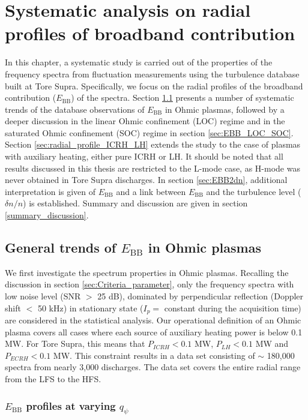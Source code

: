 \chapter{Systematic analysis on radial profiles of broadband contribution} \label{ch:EBB}
\graphicspath{{chapter5_ys/}}
\minitoc

In this chapter, a systematic study is carried out of the properties of the frequency spectra from fluctuation measurements using the turbulence database built at Tore Supra. Specifically, we focus on the radial profiles of the broadband contribution ($E_\mathrm{BB}$) of the spectra. Section \ref{sec:radial_profile_OH} presents a number of systematic trends of the database observations of $E_\mathrm{BB}$ in Ohmic plasmas, followed by a deeper discussion in the linear Ohmic confinement (LOC) regime and in the saturated Ohmic confinement (SOC) regime in section \ref{sec:EBB_LOC_SOC}. Section \ref{sec:radial_profile_ICRH_LH} extends the study to the case of plasmas with auxiliary heating, either pure ICRH or LH. It should be noted that all results discussed in this thesis are restricted to the L-mode case, as H-mode was never obtained in Tore Supra discharges. In section \ref{sec:EBB2dn}, additional interpretation is given of $E_\mathrm{BB}$ and a link between $E_\mathrm{BB}$ and the turbulence level ($\delta n/n$) is established. Summary and discussion are given in section \ref{summary_discussion}.


\section{General trends of $E_\mathrm{BB}$ in Ohmic plasmas} \label{sec:radial_profile_OH}

We first investigate the spectrum properties in Ohmic plasmas. Recalling the discussion in section \ref{sec:Criteria_parameter}, only the frequency spectra with low noise level (SNR $>$ 25 dB), dominated by perpendicular reflection (Doppler shift $<$ 50 kHz) in stationary state ($I_p =$ constant during the acquisition time) are considered in the statistical analysis. Our operational definition of an Ohmic plasma covers all cases where each source of auxiliary heating power is below 0.1 MW. For Tore Supra, this means that $P_{ICRH} < 0.1$ MW, $P_{LH} < 0.1$ MW and $P_{ECRH} < 0.1$ MW. This constraint results in a data set consisting of $\sim$ 180,000 spectra from nearly 3,000 discharges. The data set covers the entire radial range from the LFS to the HFS.


\subsection{$E_\mathrm{BB}$ profiles at varying $q_{\psi}$}


